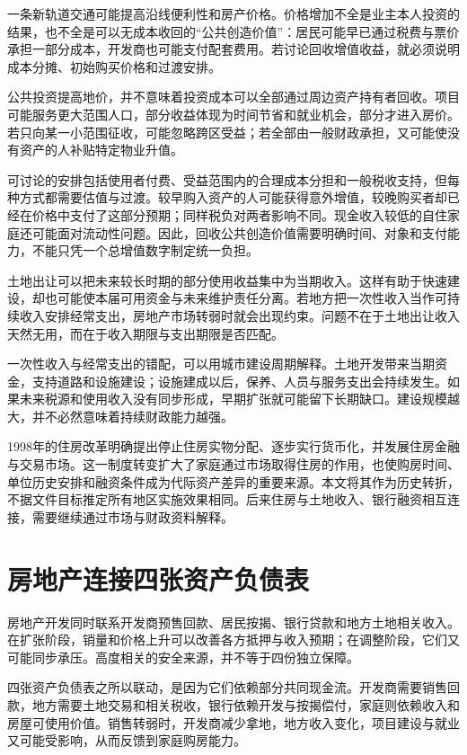 \documentclass[UTF8,fontset=fandol,zihao=-4,oneside,openany]{ctexbook}
\begin{document}
一条新轨道交通可能提高沿线便利性和房产价格。价格增加不全是业主本人投资的结果，也不全是可以无成本收回的“公共创造价值”：居民可能早已通过税费与票价承担一部分成本，开发商也可能支付配套费用。若讨论回收增值收益，就必须说明成本分摊、初始购买价格和过渡安排。

\label{arg:P120}
公共投资提高地价，并不意味着投资成本可以全部通过周边资产持有者回收。项目可能服务更大范围人口，部分收益体现为时间节省和就业机会，部分才进入房价。若只向某一小范围征收，可能忽略跨区受益；若全部由一般财政承担，又可能使没有资产的人补贴特定物业升值。

可讨论的安排包括使用者付费、受益范围内的合理成本分担和一般税收支持，但每种方式都需要估值与过渡。较早购入资产的人可能获得意外增值，较晚购买者却已经在价格中支付了这部分预期；同样税负对两者影响不同。现金收入较低的自住家庭还可能面对流动性问题。因此，回收公共创造价值需要明确时间、对象和支付能力，不能只凭一个总增值数字制定统一负担。

土地出让可以把未来较长时期的部分使用收益集中为当期收入。这样有助于快速建设，却也可能使本届可用资金与未来维护责任分离。若地方把一次性收入当作可持续收入安排经常支出，房地产市场转弱时就会出现约束。问题不在于土地出让收入天然无用，而在于收入期限与支出期限是否匹配。

\label{arg:P121}
一次性收入与经常支出的错配，可以用城市建设周期解释。土地开发带来当期资金，支持道路和设施建设；设施建成以后，保养、人员与服务支出会持续发生。如果未来税源和使用收入没有同步形成，早期扩张就可能留下长期缺口。建设规模越大，并不必然意味着持续财政能力越强。

1998年的住房改革明确提出停止住房实物分配、逐步实行货币化，并发展住房金融与交易市场。这一制度转变扩大了家庭通过市场取得住房的作用，也使购房时间、单位历史安排和融资条件成为代际资产差异的重要来源。本文将其作为历史转折，不据文件目标推定所有地区实施效果相同。后来住房与土地收入、银行融资相互连接，需要继续通过市场与财政资料解释。\cite{Housing1998}

\section{房地产连接四张资产负债表}
房地产开发同时联系开发商预售回款、居民按揭、银行贷款和地方土地相关收入。在扩张阶段，销量和价格上升可以改善各方抵押与收入预期；在调整阶段，它们又可能同步承压。高度相关的安全来源，并不等于四份独立保障。

\label{arg:P122}
四张资产负债表之所以联动，是因为它们依赖部分共同现金流。开发商需要销售回款，地方需要土地交易和相关税收，银行依赖开发与按揭偿付，家庭则依赖收入和房屋可使用价值。销售转弱时，开发商减少拿地，地方收入变化，项目建设与就业又可能受影响，从而反馈到家庭购房能力。
\end{document}
